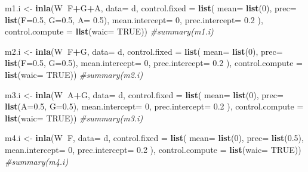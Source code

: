 \documentclass[
]{article}
\newenvironment{Shaded}{\begin{snugshade}}{\end{snugshade}}
\newcommand{\CommentTok}[1]{\textcolor[rgb]{0.56,0.35,0.01}{\textit{#1}}}
\newcommand{\DataTypeTok}[1]{\textcolor[rgb]{0.13,0.29,0.53}{#1}}
\newcommand{\DecValTok}[1]{\textcolor[rgb]{0.00,0.00,0.81}{#1}}
\newcommand{\FloatTok}[1]{\textcolor[rgb]{0.00,0.00,0.81}{#1}}
\newcommand{\KeywordTok}[1]{\textcolor[rgb]{0.13,0.29,0.53}{\textbf{#1}}}
\newcommand{\NormalTok}[1]{#1}
\newcommand{\OperatorTok}[1]{\textcolor[rgb]{0.81,0.36,0.00}{\textbf{#1}}}
\newcommand{\OtherTok}[1]{\textcolor[rgb]{0.56,0.35,0.01}{#1}}
\newcommand{\StringTok}[1]{\textcolor[rgb]{0.31,0.60,0.02}{#1}}
\begin{document}
\begin{Shaded}
\begin{Highlighting}[]
\NormalTok{m1.i <-}\StringTok{ }\KeywordTok{inla}\NormalTok{(W}\OperatorTok{~}\NormalTok{F}\OperatorTok{+}\NormalTok{G}\OperatorTok{+}\NormalTok{A, }\DataTypeTok{data=}\NormalTok{ d, }\DataTypeTok{control.fixed =} \KeywordTok{list}\NormalTok{(}
        \DataTypeTok{mean=} \KeywordTok{list}\NormalTok{(}\DecValTok{0}\NormalTok{), }
        \DataTypeTok{prec=} \KeywordTok{list}\NormalTok{(}\DataTypeTok{F=}\FloatTok{0.5}\NormalTok{, }\DataTypeTok{G=}\FloatTok{0.5}\NormalTok{, }\DataTypeTok{A=} \FloatTok{0.5}\NormalTok{), }
        \DataTypeTok{mean.intercept=} \DecValTok{0}\NormalTok{, }
        \DataTypeTok{prec.intercept=} \FloatTok{0.2}
\NormalTok{), }
\DataTypeTok{control.compute =} \KeywordTok{list}\NormalTok{(}\DataTypeTok{waic=} \OtherTok{TRUE}\NormalTok{))}
\CommentTok{#summary(m1.i)}

\NormalTok{m2.i <-}\StringTok{ }\KeywordTok{inla}\NormalTok{(W}\OperatorTok{~}\NormalTok{F}\OperatorTok{+}\NormalTok{G, }\DataTypeTok{data=}\NormalTok{ d, }\DataTypeTok{control.fixed =} \KeywordTok{list}\NormalTok{(}
        \DataTypeTok{mean=} \KeywordTok{list}\NormalTok{(}\DecValTok{0}\NormalTok{), }
        \DataTypeTok{prec=} \KeywordTok{list}\NormalTok{(}\DataTypeTok{F=}\FloatTok{0.5}\NormalTok{, }\DataTypeTok{G=}\FloatTok{0.5}\NormalTok{), }
        \DataTypeTok{mean.intercept=} \DecValTok{0}\NormalTok{, }
        \DataTypeTok{prec.intercept=} \FloatTok{0.2}
\NormalTok{), }
\DataTypeTok{control.compute =} \KeywordTok{list}\NormalTok{(}\DataTypeTok{waic=} \OtherTok{TRUE}\NormalTok{))}
\CommentTok{#summary(m2.i)}

\NormalTok{m3.i <-}\StringTok{ }\KeywordTok{inla}\NormalTok{(W}\OperatorTok{~}\NormalTok{A}\OperatorTok{+}\NormalTok{G, }\DataTypeTok{data=}\NormalTok{ d, }\DataTypeTok{control.fixed =} \KeywordTok{list}\NormalTok{(}
        \DataTypeTok{mean=} \KeywordTok{list}\NormalTok{(}\DecValTok{0}\NormalTok{), }
        \DataTypeTok{prec=} \KeywordTok{list}\NormalTok{(}\DataTypeTok{A=}\FloatTok{0.5}\NormalTok{, }\DataTypeTok{G=}\FloatTok{0.5}\NormalTok{), }
        \DataTypeTok{mean.intercept=} \DecValTok{0}\NormalTok{, }
        \DataTypeTok{prec.intercept=} \FloatTok{0.2}
\NormalTok{), }
\DataTypeTok{control.compute =} \KeywordTok{list}\NormalTok{(}\DataTypeTok{waic=} \OtherTok{TRUE}\NormalTok{))}
\CommentTok{#summary(m3.i)}

\NormalTok{m4.i <-}\StringTok{ }\KeywordTok{inla}\NormalTok{(W}\OperatorTok{~}\NormalTok{F, }\DataTypeTok{data=}\NormalTok{ d, }\DataTypeTok{control.fixed =} \KeywordTok{list}\NormalTok{(}
        \DataTypeTok{mean=} \KeywordTok{list}\NormalTok{(}\DecValTok{0}\NormalTok{), }
        \DataTypeTok{prec=} \KeywordTok{list}\NormalTok{(}\FloatTok{0.5}\NormalTok{), }
        \DataTypeTok{mean.intercept=} \DecValTok{0}\NormalTok{, }
        \DataTypeTok{prec.intercept=} \FloatTok{0.2}
\NormalTok{), }
\DataTypeTok{control.compute =} \KeywordTok{list}\NormalTok{(}\DataTypeTok{waic=} \OtherTok{TRUE}\NormalTok{))}
\CommentTok{#summary(m4.i)}


\end{Highlighting}
\end{Shaded}
\end{document}
